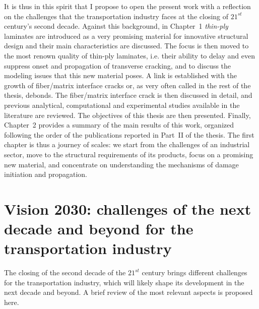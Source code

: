 It is thus in this spirit that I propose to open the present work with a reflection on the challenges that the transportation industry faces at the closing of $21^{st}$ century's second decade. Against this background, in Chapter~1 \emph{thin-ply} laminates are introduced as a very promising material for innovative structural design and their main characteristics are discussed. The focus is then moved to the most renown quality of thin-ply laminates, i.e. their ability to delay and even suppress onset and propagation of transverse cracking, and to discuss the modeling issues that this new material poses. A link is established with the growth of fiber/matrix interface cracks or, as very often called in the rest of the thesis, debonds. The fiber/matrix interface crack is then discussed in detail, and previous analytical, computational and experimental studies available in the literature are reviewed. The objectives of this thesis are then presented. Finally, Chapter~2 provides a summary of the main results of this work, organized following the order of the publications reported in Part~II of the thesis. The first chapter is thus a journey of scales: we start from the challenges of an industrial sector, move to the structural requirements of its products, focus on a promising new material, and concentrate on understanding the mechanisms of damage initiation and propagation.

\section{Vision 2030: challenges of the next decade and beyond for the transportation industry}

The closing of the second decade of the $21^{st}$ century brings different challenges for the transportation industry, which will likely shape its development in the next decade and beyond. A brief review of the most relevant aspects is proposed here.

